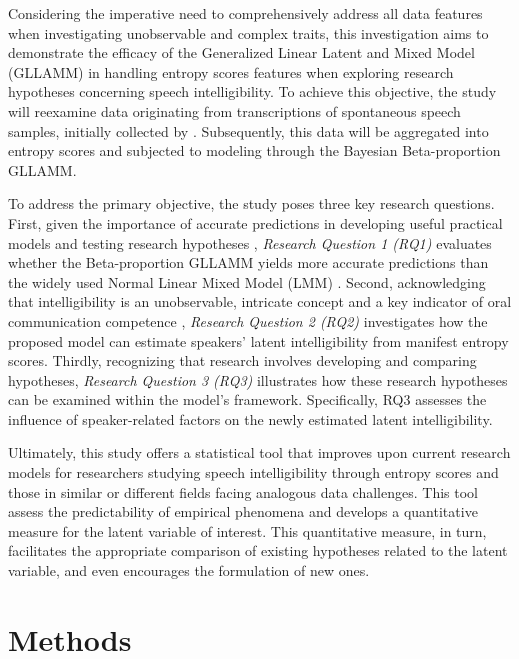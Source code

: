 \documentclass[
  authoryear,
  preprint,
  1p]{elsarticle}
\begin{document}
{Considering the imperative need to comprehensively address all data
features when investigating unobservable and complex traits, this
investigation aims to demonstrate the efficacy of the Generalized Linear
Latent and Mixed Model (GLLAMM) in handling entropy scores features when
exploring research hypotheses concerning speech intelligibility.} To
achieve this objective, the study will reexamine data originating from
transcriptions of spontaneous speech samples, initially collected by
\citet{Boonen_et_al_2021}. Subsequently, this data will be aggregated
into entropy scores and subjected to modeling through the Bayesian
Beta-proportion GLLAMM.

To address the primary objective, the study poses three key research
questions. {First, given the importance of accurate predictions in
developing useful practical models and testing research hypotheses
\citep{Shmueli_et_al_2012},} \emph{Research Question 1 (RQ1)} evaluates
whether the Beta-proportion GLLAMM yields more accurate predictions than
the widely used Normal Linear Mixed Model (LMM)
\citep{Holmes_et_al_2019}. Second, acknowledging that intelligibility is
an unobservable, intricate concept and a key indicator of oral
communication competence \citep{Kent_et_al_1994}, \emph{Research
Question 2 (RQ2)} investigates how the proposed model can estimate
speakers' latent intelligibility from manifest entropy scores. {Thirdly,
recognizing that research involves developing and comparing hypotheses,
\emph{Research Question 3 (RQ3)} illustrates how these research
hypotheses can be examined within the model's framework.} Specifically,
RQ3 assesses the influence of speaker-related factors on the newly
estimated latent intelligibility.

{Ultimately, this study offers a statistical tool that improves upon
current research models for researchers studying speech intelligibility
through entropy scores and those in similar or different fields facing
analogous data challenges. This tool assess the predictability of
empirical phenomena and develops a quantitative measure for the latent
variable of interest. This quantitative measure, in turn, facilitates
the appropriate comparison of existing hypotheses related to the latent
variable, and even encourages the formulation of new ones.}

\section{Methods}\label{sec-methods}
\end{document}
